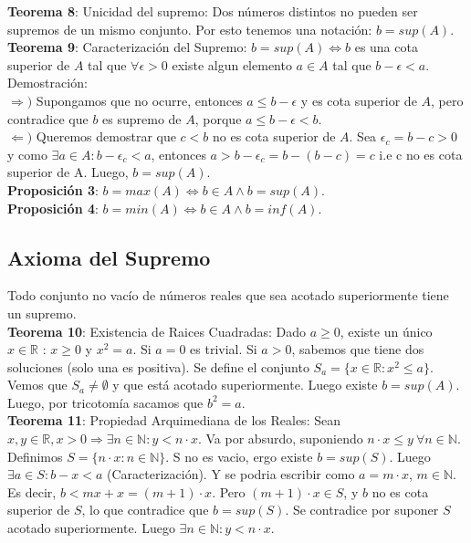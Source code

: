 \documentclass[11pt,a4paper]{article}
\begin{document}
\noindent \dotfill

\noindent \textbf{Teorema 8}: Unicidad del supremo: Dos n\'umeros distintos no pueden ser supremos de un mismo conjunto. Por esto tenemos una notaci\'on: $b = sup(A)$.\\
\noindent \textbf{Teorema 9}: Caracterizaci\'on del Supremo: $b = sup(A) \iff b$ es una cota superior de $A$ tal que $\forall \epsilon > 0$ existe algun elemento $a \in A$ tal que $b - \epsilon < a$.\\
Demostraci\'on:\\
$\Rightarrow )$ Supongamos que no ocurre, entonces $a \leq b - \epsilon$ y es cota superior de $A$, pero contradice que $b$ es supremo de $A$, porque $a \leq b - \epsilon < b$.\\
$\Leftarrow )$ Queremos demostrar que $c < b$ no es cota superior de $A$. Sea $\epsilon_c = b - c > 0$ y como $\exists a \in A : b - \epsilon_c < a$, entonces $a > b - \epsilon_c = b - (b - c) = c$ i.e c no es cota superior de A. Luego, $b = sup(A)$.\\
\noindent \textbf{Proposici\'on 3}: $b = max(A) \iff b \in A \land b = sup(A)$.\\
\noindent \textbf{Proposici\'on 4}: $b = min(A) \iff b \in A \land b = inf(A)$.

\newpage

\subsection{Axioma del Supremo}
Todo conjunto no vac\'io de n\'umeros reales que sea acotado superiormente tiene un supremo.\\

\noindent \textbf{Teorema 10}: Existencia de Raices Cuadradas: Dado $a \geq 0$, existe un \'unico $x \in \mathbb{R}$ : $x \geq 0$ y $x^2 = a$. Si $a=0$ es trivial. Si $a > 0$, sabemos que tiene dos soluciones (solo una es positiva). Se define el conjunto $S_a = \{ x \in \mathbb{R} : x^2 \leq a \}$. Vemos que $S_a \not = \emptyset$ y que est\'a acotado superiormente. Luego existe $b = sup(A)$. Luego, por tricotom\'ia sacamos que $b^2 = a$.\\

\noindent \textbf{Teorema 11}: Propiedad Arquimediana de los Reales: Sean $x,y \in \mathbb{R}, x > 0 \Rightarrow \exists n \in \mathbb{N} : y < n \cdot x$. Va por absurdo, suponiendo $n\cdot x \leq y\ \forall n \in \mathbb{N}$. Definimos $S = \{ n\cdot x : n \in \mathbb{N} \}$. S no es vacio, ergo existe $b=sup(S)$. Luego $\exists a \in S : b - x < a$ (Caracterizaci\'on). Y se podria escribir como $a = m \cdot x$, $m \in \mathbb{N}$. Es decir, $b < mx + x = (m+1) \cdot x$. Pero $(m+1) \cdot x \in S$, y $b$ no es cota superior de $S$, lo que contradice que $b = sup(S)$. Se contradice por suponer $S$ acotado superiormente. Luego $\exists n \in \mathbb{N} : y < n\cdot x$.\\
\end{document}
